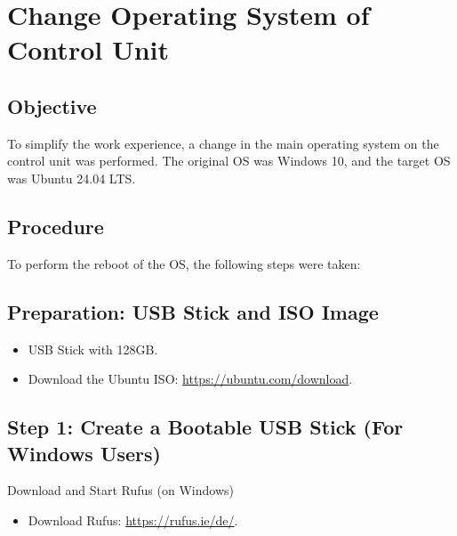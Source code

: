 \section{Change Operating System of Control Unit}

\subsection{Objective}
To simplify the work experience, a change in the main operating system on the control unit was performed. The original OS was Windows 10, and the target OS was Ubuntu 24.04 LTS.

\subsection{Procedure}
To perform the reboot of the OS, the following steps were taken:

\subsection{Preparation: USB Stick and ISO Image}
\begin{itemize}
    \item USB Stick with 128GB.
    \item Download the Ubuntu ISO: \href{https://ubuntu.com/download}{https://ubuntu.com/download}.
\end{itemize}

\subsection{Step 1: Create a Bootable USB Stick (For Windows Users)}
Download and Start Rufus (on Windows)
\begin{itemize}
    \item Download Rufus: \href{https://rufus.ie/de/}{https://rufus.ie/de/}.
\end{itemize}

